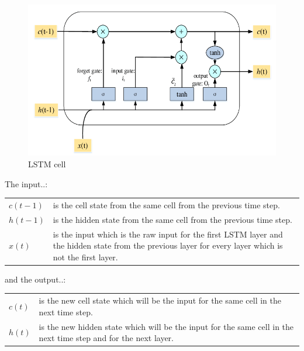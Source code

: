 \documentclass[a4paper,12pt]{report}
\begin{document}
\begin{figure}[htbp]
  \centering
  \includegraphics[width=\textwidth]{images/LSTM.png}
  \caption{LSTM cell}
  \label{fig:fullwidth}
\end{figure}

	
	
\begin{minipage}{\textwidth}
	The input..:\\
\medskip
\begin{tabularx}{\textwidth}{@{}l@{\hspace{2em}--\hspace{2em}}X@{}}
  $c(t-1)$ & is the cell state from the same cell from the previous time step. \\
  $h(t-1)$ & is the hidden state from the same cell from the previous time step. \\
  $x(t)$   & is the input which is the raw input for the first LSTM layer and the hidden state from the previous layer for every layer which is not the first layer. \\
\end{tabularx}


\end{minipage}

\begin{minipage}{\textwidth}

	and the output..:\\


\begin{tabularx}{\textwidth}{@{}l@{\hspace{2em}--\hspace{2em}}X@{}}
  $c(t)$ & is the new cell state which will be the input for the same cell in the next time step. \\
  $h(t)$ & is the new hidden state which will be the input for the same cell in the next time step and for the next layer. \\
\end{tabularx}\\
\end{minipage}
\end{document}
